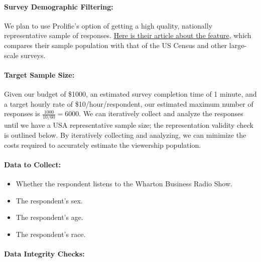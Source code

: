 \documentclass[
]{article}
\providecommand{\tightlist}{%
  \setlength{\itemsep}{0pt}\setlength{\parskip}{0pt}}
\begin{document}
\hypertarget{survey-demographic-filtering}{%
\paragraph{Survey Demographic
Filtering:}\label{survey-demographic-filtering}}

We plan to use Prolific's option of getting a high quality, nationally
representative sample of responses.
\href{https://researcher-help.prolific.com/hc/en-gb/articles/360019236753-Representative-samples\#:~:text=\textquotesingle{}ve\%20tested\%E2\%80\%9D.-,How\%20does\%20Prolific\textquotesingle{}s\%20representative\%20samples\%20tool\%20work\%3F,\%3A\%20age\%2C\%20sex\%20and\%20ethnicity.}{Here
is their article about the feature}, which compares their sample
population with that of the US Census and other large-scale surveys.

\hypertarget{target-sample-size}{%
\paragraph{Target Sample Size:}\label{target-sample-size}}

Given our budget of \$1000, an estimated survey completion time of 1
minute, and a target hourly rate of \$10/hour/respondent, our estimated
maximum number of responses is \(\frac{1000}{10/60}=6000\). We can
iteratively collect and analyze the responses until we have a USA
representative sample size; the representation validity check is
outlined below. By iteratively collecting and analyzing, we can minimize
the costs required to accurately estimate the viewership population.

\hypertarget{data-to-collect}{%
\paragraph{Data to Collect:}\label{data-to-collect}}

\begin{itemize}
\tightlist
\item
  Whether the respondent listens to the Wharton Business Radio Show.
\item
  The respondent's sex.
\item
  The respondent's age.
\item
  The respondent's race.
\end{itemize}

\hypertarget{data-integrity-checks}{%
\paragraph{Data Integrity Checks:}\label{data-integrity-checks}}
\end{document}
